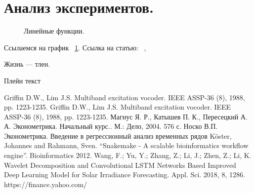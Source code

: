 \documentclass[a4paper,article,14pt]{extarticle}
\begin{document}
\section{Анализ экспериментов.}
\begin{figure}[ht]
\begin{center}

\caption{
\label{graph-fig}
     Линейные функции.}
\end {center}
\end {figure}
Ссылаемся на график ~\ref{graph-fig}.
Ссылка на статью: ~\cite{voc}, ~\cite{vo2}

Жизнь --- тлен.
\pagebreak


Плейн текст

\begin{thebibliography}{1}
 Griffin D.W., Lim J.S. \flqq Multiband excitation vocoder\frqq. IEEE ASSP-36 (8), 1988, pp. 1223-1235.
 Griffin D.W., Lim J.S. \flqq Multiband excitation vocoder\frqq. IEEE ASSP-36 (8), 1988, pp. 1223-1235.
 Магнус Я. Р., Катышев П. К., Пересецкий А. А. Эконометрика. Начальный курс.. М.: Дело, 2004. 576 с.
 Носко В.П. Эконометрика. Введение в регрессионный анализ временных рядов
 Köster, Johannes and Rahmann, Sven. “Snakemake - A scalable bioinformatics workflow engine”. Bioinformatics 2012.
 Wang, F.; Yu, Y.; Zhang, Z.; Li, J.; Zhen, Z.; Li, K. Wavelet Decomposition and Convolutional LSTM Networks Based Improved Deep Learning Model for Solar Irradiance Forecasting. Appl. Sci. 2018, 8, 1286.
 https://finance.yahoo.com/
\end{thebibliography}
\end{document}
